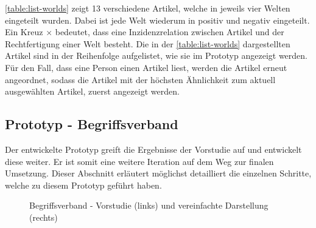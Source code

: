 \autoref{table:list-worlds} zeigt 13 verschiedene Artikel, welche in jeweils vier Welten eingeteilt wurden.
Dabei ist jede Welt wiederum in positiv und negativ eingeteilt.
Ein Kreuz $\times$ bedeutet, dass eine Inzidenzrelation zwischen Artikel und der Rechtfertigung einer Welt besteht.
Die in der \autoref{table:list-worlds} dargestellten Artikel sind in der Reihenfolge aufgelistet, wie sie im Prototyp angezeigt werden.
Für den Fall, dass eine Person einen Artikel liest, werden die Artikel erneut angeordnet, sodass die Artikel mit der höchsten Ähnlichkeit zum aktuell ausgewählten Artikel, zuerst angezeigt werden.

\subsection{Prototyp - Begriffsverband}\label{subsubsec:prototyp-2}
Der entwickelte Prototyp greift die Ergebnisse der Vorstudie auf und entwickelt diese weiter.
Er ist somit eine weitere Iteration auf dem Weg zur finalen Umsetzung.
Dieser Abschnitt erläutert möglichst detailliert die einzelnen Schritte, welche zu diesem Prototyp geführt haben.\\

\begin{figure}[!ht]
    \centering
    \caption{Begriffsverband - Vorstudie (links) und vereinfachte Darstellung (rechts)}
    \label{fig:industry-comparison}
\end{figure}

